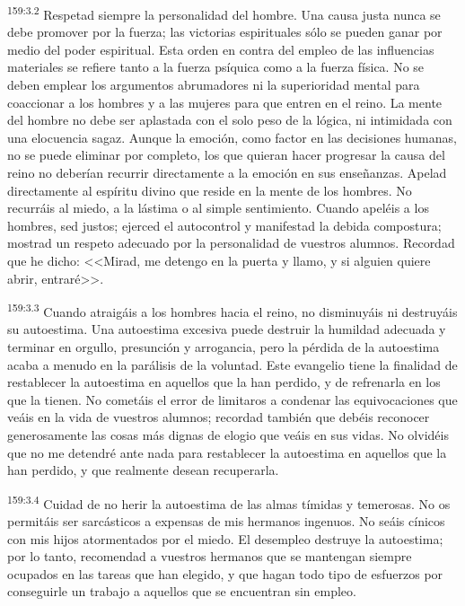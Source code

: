 \par 
\textsuperscript{159:3.2} Respetad siempre la personalidad del hombre. Una causa justa nunca se debe promover por la fuerza; las victorias espirituales sólo se pueden ganar por medio del poder espiritual. Esta orden en contra del empleo de las influencias materiales se refiere tanto a la fuerza psíquica como a la fuerza física. No se deben emplear los argumentos abrumadores ni la superioridad mental para coaccionar a los hombres y a las mujeres para que entren en el reino. La mente del hombre no debe ser aplastada con el solo peso de la lógica, ni intimidada con una elocuencia sagaz. Aunque la emoción, como factor en las decisiones humanas, no se puede eliminar por completo, los que quieran hacer progresar la causa del reino no deberían recurrir directamente a la emoción en sus enseñanzas. Apelad directamente al espíritu divino que reside en la mente de los hombres. No recurráis al miedo, a la lástima o al simple sentimiento. Cuando apeléis a los hombres, sed justos; ejerced el autocontrol y manifestad la debida compostura; mostrad un respeto adecuado por la personalidad de vuestros alumnos. Recordad que he dicho: <<Mirad, me detengo en la puerta y llamo, y si alguien quiere abrir, entraré>>.

\par 
\textsuperscript{159:3.3} Cuando atraigáis a los hombres hacia el reino, no disminuyáis ni destruyáis su autoestima. Una autoestima excesiva puede destruir la humildad adecuada y terminar en orgullo, presunción y arrogancia, pero la pérdida de la autoestima acaba a menudo en la parálisis de la voluntad. Este evangelio tiene la finalidad de restablecer la autoestima en aquellos que la han perdido, y de refrenarla en los que la tienen. No cometáis el error de limitaros a condenar las equivocaciones que veáis en la vida de vuestros alumnos; recordad también que debéis reconocer generosamente las cosas más dignas de elogio que veáis en sus vidas. No olvidéis que no me detendré ante nada para restablecer la autoestima en aquellos que la han perdido, y que realmente desean recuperarla.

\par 
\textsuperscript{159:3.4} Cuidad de no herir la autoestima de las almas tímidas y temerosas. No os permitáis ser sarcásticos a expensas de mis hermanos ingenuos. No seáis cínicos con mis hijos atormentados por el miedo. El desempleo destruye la autoestima; por lo tanto, recomendad a vuestros hermanos que se mantengan siempre ocupados en las tareas que han elegido, y que hagan todo tipo de esfuerzos por conseguirle un trabajo a aquellos que se encuentran sin empleo.

